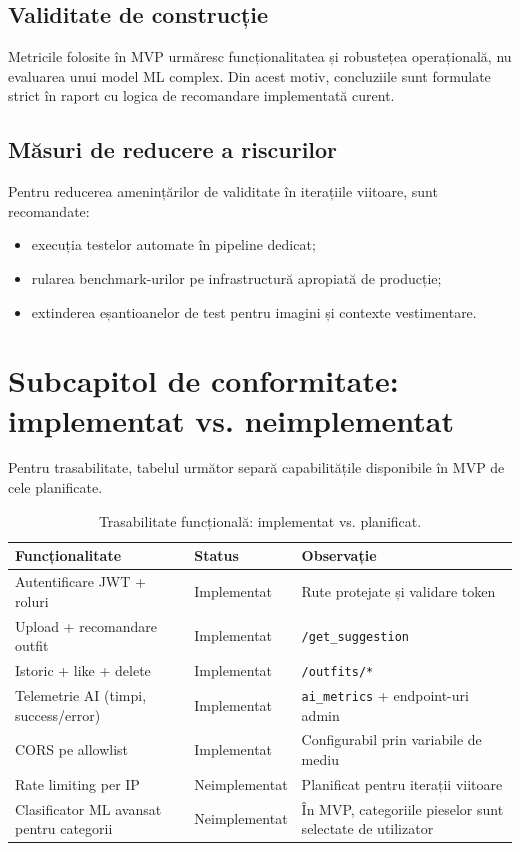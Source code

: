 \subsection{Validitate de construcție}
Metricile folosite în MVP urmăresc funcționalitatea și robustețea operațională, nu evaluarea unui model ML complex. Din acest motiv, concluziile sunt formulate strict în raport cu logica de recomandare implementată curent.

\subsection{Măsuri de reducere a riscurilor}
Pentru reducerea amenințărilor de validitate în iterațiile viitoare, sunt recomandate:
\begin{itemize}
    \item execuția testelor automate în pipeline dedicat;
    \item rularea benchmark-urilor pe infrastructură apropiată de producție;
    \item extinderea eșantioanelor de test pentru imagini și contexte vestimentare.
\end{itemize}

\section{Subcapitol de conformitate: implementat vs. neimplementat}
Pentru trasabilitate, tabelul următor separă capabilitățile disponibile în MVP de cele planificate.

\begin{table}[h]
    \centering
    \begin{tabular}{|p{6cm}|p{3cm}|p{4cm}|}
    \hline
    \textbf{Funcționalitate} & \textbf{Status} & \textbf{Observație} \\ \hline
    Autentificare JWT + roluri & Implementat & Rute protejate și validare token \\ \hline
    Upload + recomandare outfit & Implementat & \texttt{/get\_suggestion} \\ \hline
    Istoric + like + delete & Implementat & \texttt{/outfits/*} \\ \hline
    Telemetrie AI (timpi, success/error) & Implementat & \texttt{ai\_metrics} + endpoint-uri admin \\ \hline
    CORS pe allowlist & Implementat & Configurabil prin variabile de mediu \\ \hline
    Rate limiting per IP & Neimplementat & Planificat pentru iterații viitoare \\ \hline
    Clasificator ML avansat pentru categorii & Neimplementat & În MVP, categoriile pieselor sunt selectate de utilizator \\ \hline
    \end{tabular}
    \caption{Trasabilitate funcțională: implementat vs. planificat.}
    \label{tab:implemented_vs_planned}
\end{table}

